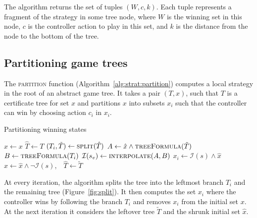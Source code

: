 The algorithm returns the set of tuples $(W, c, k)$.  Each tuple represents a fragment of the strategy in some tree node, where $W$ is the winning set in this node, $c$ is the controller action to play in this set, and $k$ is the distance from the node to the bottom of the tree.

\subsection{Partitioning game trees}

The \textsc{partition} function (Algorithm~\ref{alg:strat:partition}) computes a local strategy in the root of an abstract game tree.  It takes a pair $(T, x)$, such that $T$ is a certificate tree for set $x$ and partitions $x$ into subsets $x_i$ such that the controller can win by choosing action $c_i$ in $x_i$.

\begin{algorithm}[t]
   \caption{Partitioning winning states}\label{alg:strat:partition}
   \begin{algorithmic}[1]
        \State $\hat{x} \gets x$
        \State $\hat{T} \gets T$
        \State $(T_i, \tilde{T}) \gets \Call{split}{\hat{T}}$\label{alg:partition:split}
            \State $A \gets \hat{x} \land \Call{treeFormula}{\tilde{T}} $ \label{alg:strat:partition:Bi}
            \State $B \gets \Call{treeFormula}{T_i} $ \label{alg:strat:partition:Ai}
            \State $\mathcal{I}(s_v) \gets \Call{interpolate}{A, B}$\label{alg:partition:I}
            \State $x_i \gets \mathcal{I}(s) \land \hat{x}$\label{alg:partition:Ii}
            \State $\hat{x} \gets \hat{x} \land \neg\mathcal{I}(s)$,~~$\hat{T} \gets \tilde{T}$\label{alg:partition:upd}
        \EndFor
        \State \Return{$[(T_1, x_1),\ldots, (T_j, x_j)]$} \label{alg:strat:partition:return}
        \EndFunction
    \end{algorithmic}
\end{algorithm}

At every iteration, the algorithm splits the tree into the leftmost branch $T_i$ and the remaining tree (Figure~\ref{fig:split}).  It then computes the set $x_i$ where the controller wins by following the branch $T_i$ and removes $x_i$ from the initial set $x$.  At the next iteration it considers the leftover tree $\tilde{T}$ and the shrunk initial set $\hat{x}$.

